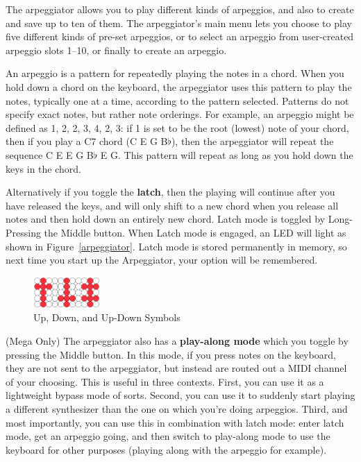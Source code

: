 \documentclass{article}
\begin{document}
The arpeggiator allows you to play different kinds of arpeggios, and also to create and save up to ten of them.  The arpeggiator's main menu lets you choose to play five different kinds of pre-set arpeggios, or to select an arpeggio from user-created arpeggio slots 1--10, or finally to create an arpeggio.

An arpeggio is a pattern for repeatedly playing the notes in a chord.  When you hold down a chord on the keyboard, the arpeggiator uses this pattern to play the notes, typically one at a time, according to the pattern selected.  Patterns do not specify exact notes, but rather note orderings.  For example, an arpeggio might be defined as 1, 2, 2, 3, 4, 2, 3: if 1 is set to be the root (lowest) note of your chord, then if you play a C7 chord (C E G B$\flat$), then the arpeggiator will repeat the sequence C E E G B$\flat$ E G.  This pattern will repeat as long as you hold down the keys in the chord.  

Alternatively if you toggle the {\bf latch}, then the playing will continue after you have released the keys, and will only shift to a new chord when you release all notes and then hold down an entirely new chord.  Latch mode is toggled by Long-Pressing the Middle button.  When Latch mode is engaged, an LED will light as shown in Figure~\ref{arpeggiator}.  Latch mode is stored permanently in memory, so next time you start up the Arpeggiator, your option will be remembered.

\begin{figure}
\begin{center}
\vspace{-2em}\includegraphics[width=1in]{updown}
\vspace{-1em}
\caption{\small Up, Down, and Up-Down Symbols}
\vspace{-2em}
\end{center}
\end{figure}

(Mega Only) The arpeggiator also has a {\bf play-along mode} which you toggle by pressing the Middle button.  In this mode, if you press notes on the keyboard, they are not sent to the arpeggiator, but instead are routed out a MIDI channel of your choosing.  This is useful in three contexts.  First, you can use it as a lightweight bypass mode of sorts.  Second, you can use it to suddenly start playing a different synthesizer than the one on which you're doing arpeggios.   Third, and most importantly, you can use this in combination with latch mode: enter latch mode, get an arpeggio going, and then switch to play-along mode to use the keyboard for other purposes (playing along with the arpeggio for example).
\end{document}

